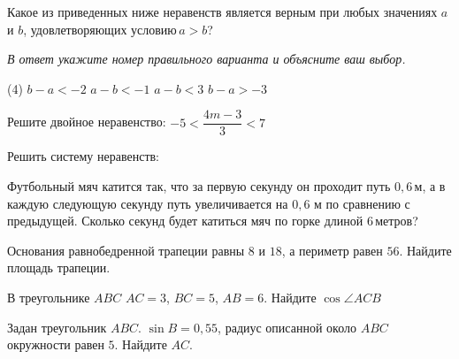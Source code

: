 %
%
\begin{homework}[number=2]
	\begin{listofex}
		\item Какое из приведенных ниже неравенств является верным при любых значениях \( a \) и \( b \), удовлетворяющих условию \( a > b \)?
		
		\textit{В ответ укажите номер правильного варианта и объясните ваш выбор.}
		\begin{tasks}(4)
			\task \( b-a < -2 \)
			\task \( a-b < -1 \)
			\task \( a-b < 3 \)
			\task \( b-a > -3 \)
		\end{tasks}
		\item {}
		\item Решите двойное неравенство: \( -5<\dfrac{4m-3}{3}<7 \)
		\item Решить систему неравенств:
		\begin{itasks}[2]
			\task {}
			\task {}
		\end{itasks}
		\item Футбольный мяч катится так, что за первую секунду он проходит путь \( 0,6 \) м, а в каждую следующую секунду путь увеличивается на \( 0,6  \) м по сравнению с предыдущей. Сколько секунд будет катиться мяч по горке длиной 6 метров?
		\item Основания равнобедренной трапеции равны \( 8 \) и \( 18 \), а периметр равен \( 56 \). Найдите площадь трапеции.
		\item В треугольнике \( ABC \) \( AC=3 \), \( BC=5 \), \( AB=6 \). Найдите \( \cos\angle ACB\)
		\item Задан треугольник \( ABC \). \( \sin B=0,55 \), радиус описанной около \( ABC \) окружности равен \( 5 \). Найдите \( AC \).
	\end{listofex}
\end{homework}
%
%
